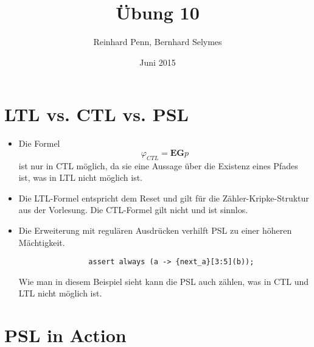 \documentclass[12pt,a4paper]{article}
\begin{document}
\title{Übung 10}
\author{Reinhard Penn, Bernhard Selymes}
\date{Juni 2015}

\normalsize


\newcommand{\srcpath}{../../src}
\newcommand{\simpath}{../../sim}



\section{LTL vs. CTL vs. PSL}

\begin{itemize}
	\item Die Formel 
		\begin{equation*}
			\varphi_{CTL} = \textbf{EG}\textit{p}
		\end{equation*}
		ist nur in CTL möglich, da sie eine Aussage über die Existenz eines Pfades ist, was in LTL nicht möglich ist.
	\item Die LTL-Formel entspricht dem Reset und gilt für die Zähler-Kripke-Struktur aus der Vorlesung. Die CTL-Formel gilt nicht und ist sinnlos.
	\item Die Erweiterung mit regulären Ausdrücken verhilft PSL zu einer höheren Mächtigkeit.
				\begin{verbatim}
				assert always (a -> {next_a}[3:5](b));
				\end{verbatim}
				Wie man in diesem Beispiel sieht kann die PSL auch zählen, was in CTL und LTL nicht möglich ist.
\end{itemize}

\section{PSL in Action}





\end{document}
